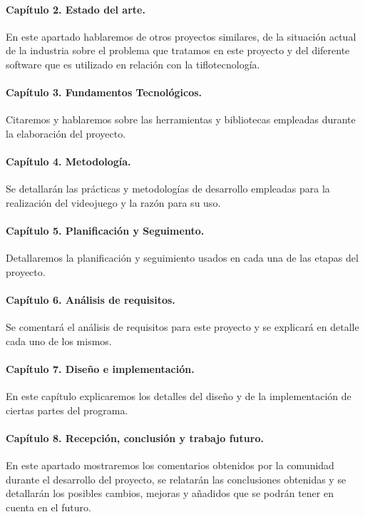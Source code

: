 \paragraph*{Capítulo 2. Estado del arte.}
En este apartado hablaremos de otros proyectos similares, de la situación actual de la industria sobre el problema que tratamos en este proyecto y del diferente software que es utilizado en relación con la tiflotecnología.

\paragraph*{Capítulo 3. Fundamentos Tecnológicos.}
Citaremos y hablaremos sobre las herramientas y bibliotecas empleadas durante la elaboración del proyecto.

\paragraph*{Capítulo 4. Metodología.}
Se detallarán las prácticas y metodologías de desarrollo empleadas para la realización del videojuego y la razón para su uso.

\paragraph*{Capítulo 5. Planificación y Seguimento.}
Detallaremos la planificación y seguimiento usados en cada una de las etapas del proyecto. 

\paragraph*{Capítulo 6. Análisis de requisitos.}
Se comentará el análisis de requisitos para este proyecto y se explicará en detalle cada uno de los mismos.

\paragraph*{Capítulo 7. Diseño e implementación.}
En este capítulo explicaremos los detalles del diseño y de la implementación de ciertas partes del programa.

\paragraph*{Capítulo 8. Recepción, conclusión y trabajo futuro.}
En este apartado mostraremos los comentarios obtenidos por la comunidad durante el desarrollo del proyecto, se relatarán las conclusiones obtenidas y se detallarán los posibles cambios, mejoras y añadidos que se podrán tener en cuenta en el futuro.





